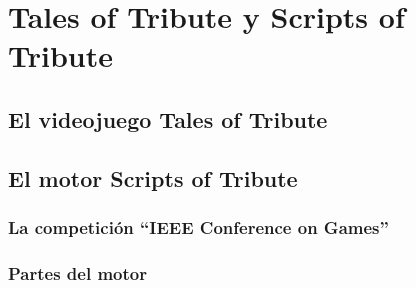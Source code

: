 \chapter{Tales of Tribute y Scripts of Tribute}


\section{El videojuego Tales of Tribute}


\section{El motor Scripts of Tribute}


\subsection{La competición ``IEEE Conference on Games''}


\subsection{Partes del motor}
